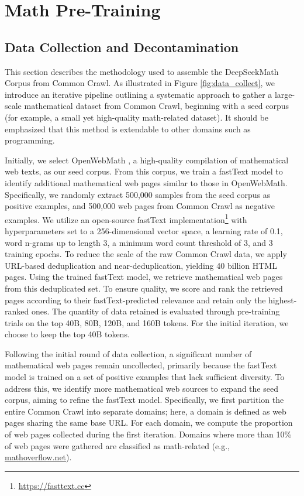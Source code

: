 \section{Math Pre-Training}

\subsection{Data Collection and Decontamination} This section describes the methodology used to assemble the DeepSeekMath Corpus from Common Crawl. As illustrated in Figure \ref{fig:data_collect}, we introduce an iterative pipeline outlining a systematic approach to gather a large-scale mathematical dataset from Common Crawl, beginning with a seed corpus (for example, a small yet high-quality math-related dataset). It should be emphasized that this method is extendable to other domains such as programming.

Initially, we select OpenWebMath \citep{openwebmath}, a high-quality compilation of mathematical web texts, as our seed corpus. From this corpus, we train a fastText model \citep{joulin2016fasttext} to identify additional mathematical web pages similar to those in OpenWebMath. Specifically, we randomly extract 500,000 samples from the seed corpus as positive examples, and 500,000 web pages from Common Crawl as negative examples. We utilize an open-source fastText implementation\footnote{\url{https://fasttext.cc}} with hyperparameters set to a 256-dimensional vector space, a learning rate of 0.1, word n-grams up to length 3, a minimum word count threshold of 3, and 3 training epochs. To reduce the scale of the raw Common Crawl data, we apply URL-based deduplication and near-deduplication, yielding 40 billion HTML pages. Using the trained fastText model, we retrieve mathematical web pages from this deduplicated set. To ensure quality, we score and rank the retrieved pages according to their fastText-predicted relevance and retain only the highest-ranked ones. The quantity of data retained is evaluated through pre-training trials on the top 40B, 80B, 120B, and 160B tokens. For the initial iteration, we choose to keep the top 40B tokens.

Following the initial round of data collection, a significant number of mathematical web pages remain uncollected, primarily because the fastText model is trained on a set of positive examples that lack sufficient diversity. To address this, we identify more mathematical web sources to expand the seed corpus, aiming to refine the fastText model. Specifically, we first partition the entire Common Crawl into separate domains; here, a domain is defined as web pages sharing the same base URL. For each domain, we compute the proportion of web pages collected during the first iteration. Domains where more than 10\% of web pages were gathered are classified as math-related (e.g., \url{mathoverflow.net}).

